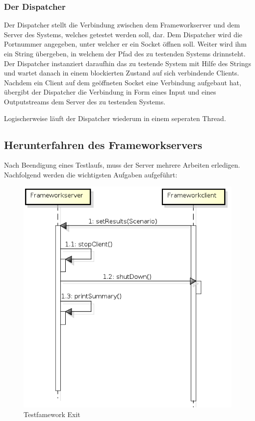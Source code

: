 \subsubsection{Der Dispatcher}
\label{sec:dispatcher}

Der Dispatcher stellt die Verbindung zwischen dem Frameworkserver und dem Server des Systems, welches getestet werden soll, dar. Dem Dispatcher wird die Portnummer angegeben, unter welcher er ein Socket öffnen soll. Weiter wird ihm ein String übergeben, in welchem der Pfad des zu testenden Systems drinnsteht. Der Dispatcher instanziert daraufhin das zu testende System mit Hilfe des Strings und wartet danach in einem blockierten Zustand auf sich verbindende Clients. Nachdem ein Client auf dem geöffneten Socket eine Verbindung aufgebaut hat, übergibt der Dispatcher die Verbindung in Form eines Input und eines Outputstreams dem Server des zu testenden Systems.

Logischerweise läuft der Dispatcher wiederum in einem seperaten Thread.

\subsection{Herunterfahren des Frameworkservers}
\label{sec:herunterfahrenFramework}

Nach Beendigung eines Testlaufs, muss der Server mehrere Arbeiten erledigen. Nachfolgend werden die wichtigsten Aufgaben aufgeführt:

\begin{figure}[H]
\begin{center}
\includegraphics[scale=0.7]{image_testFramework/BeendeTestlauf.png}
\end{center}
\caption{Testfamework Exit}
\end{figure}

